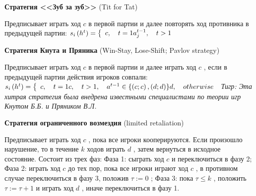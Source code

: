 \documentclass[pdftex,12pt,a4paper]{article}
\begin{document}
{\bf Стратегия <<Зуб за зуб>>} (Tit for Tat)

Предписывает играть ход  $c$  в первой партии и далее повторять ход противника в предыдущей партии:  $s_{i} \left(h^{t} \right)=\left\{\begin{array}{l} {c,\quad t=1} \par {a_{j}^{t-1} ,\quad t>1} \end{array}\right. $

{\bf Стратегия Кнута и Пряника} (Win-Stay, Lose-Shift; Pavlov strategy)

Предписывает играть ход  $c$  в первой партии и далее играть ход  $c$ , если в предыдущей партии действия игроков совпали:  $s_{i} \left(h^{t} \right)=\left\{\begin{array}{l} {c,\quad t=1} \par {c,\quad t>1,\quad a^{t-1} \in \left\{\left(c;c\right),\left(d;d\right)\right\}} \par {d,\quad otherwise} \end{array}\right. $
{\it Тигр:  Эта хитрая стратегия была внедрена известными специалистами по теории игр Кнутом Б.Б. и Пряником В.Л.}

{\bf Стратегия ограниченного возмездия} (limited retaliation)

Предписывает играть ход  $c$ , пока все игроки кооперируются. Если произошло нарушение, то в течение  $k$  ходов играть  $d$ , затем вернуться в исходное состояние. Состоит из трех фаз:
Фаза 1: сыграть ход  $c$  и переключиться в фазу 2;
Фаза 2: играть ход  $c$  до тех пор, пока все игроки играют ход  $c$ , в противном случае переключиться в фазу 3, положив  $\tau :=0$ ;
Фаза 3: пока  $\tau \le k$ , положить  $\tau :=\tau +1$  и играть ход  $d$ , иначе переключиться в фазу 1.






\printindex %
\end{document}
